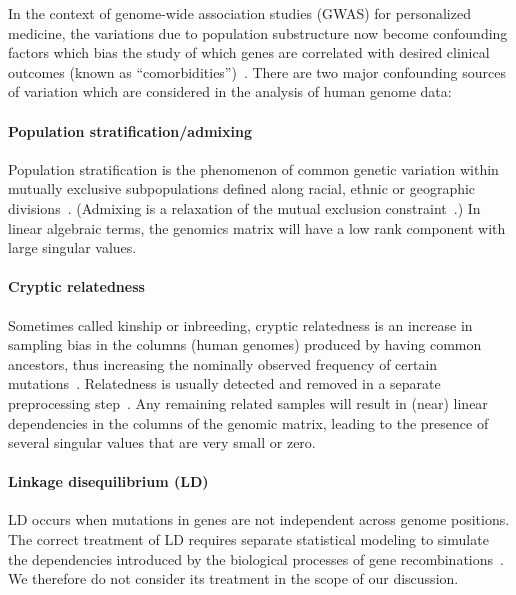 \documentclass[final,leqno]{siamltex1213}
\begin{document}
In the context of genome-wide association studies (GWAS) for personalized
medicine, the variations due to population substructure now become confounding
factors which bias the study of which genes are correlated with desired clinical
outcomes (known as ``comorbidities'')~\cite[Ch. 8]{Laird2011}.
There are two major confounding sources of variation which are considered in
the analysis of human genome data:

\paragraph{Population stratification/admixing}
Population stratification is the phenomenon of common genetic variation within
mutually exclusive subpopulations defined along racial, ethnic or geographic
divisions~\cite{Pritchard1999,Cardon2003}. (Admixing is a relaxation of the mutual exclusion constraint~\cite{Devlin1999,Sankararaman2008}.)
In linear algebraic terms, the genomics matrix will have a low rank component
with large singular values.

\paragraph{Cryptic relatedness}
Sometimes called kinship or inbreeding, cryptic relatedness is an increase in
sampling bias in the columns (human genomes) produced by having common ancestors,
thus increasing the nominally observed frequency of certain
mutations~\cite{Voight2005,Astle2009}. Relatedness is usually detected and removed in
a separate preprocessing step~\cite{PLINK}. Any remaining related samples will
result in (near) linear dependencies in the columns of the genomic matrix,
leading to the presence of several singular values that are very small or zero.

\paragraph{Linkage disequilibrium (LD)}
LD occurs when mutations in genes are not independent across genome positions.
The correct treatment of LD requires separate statistical modeling to simulate
the dependencies introduced by the biological processes of gene
recombinations~\cite{Li2003}.
We therefore do not consider its treatment in the scope of our discussion.
\end{document}
